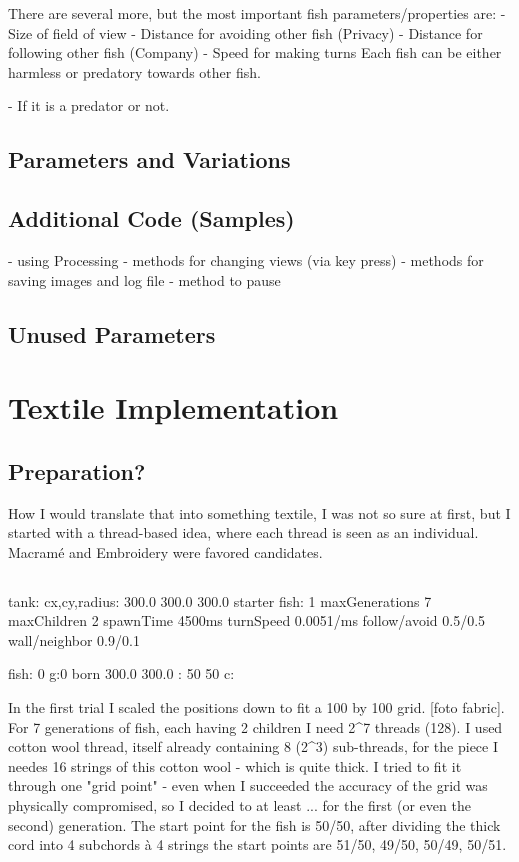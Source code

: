 \documentclass{scrartcl}
\begin{document}
There are several more, but the most important fish parameters/properties are:
-	Size of field of view
-	Distance for avoiding other fish (Privacy)
-	Distance for following other fish (Company)
-	Speed for making turns
Each fish can be either harmless or predatory towards other fish.

-	If it is a predator or not.

\subsection{Parameters and Variations} %

\subsection{Additional Code (Samples)}
- using Processing
- methods for changing views (via key press)
- methods for saving images and log file
- method to pause


\subsection{Unused Parameters}


\section{Textile Implementation}

\subsection{Preparation?}
How I would translate that into something textile, I was not so sure at first, but I started with a thread-based idea, where each thread is seen as an individual. Macramé and Embroidery were favored candidates.

\subsection{}
tank:
cx,cy,radius: 300.0 300.0 300.0
starter fish: 1
maxGenerations 7
maxChildren 2
spawnTime 4500ms
turnSpeed 0.0051/ms
follow/avoid 0.5/0.5
wall/neighbor 0.9/0.1

fish:
0 g:0 born 300.0 300.0 : 50 50 c:

In the first trial I scaled the positions down to fit a 100 by 100 grid. [foto fabric].
For 7 generations of fish, each having 2 children I need 2^7 threads (128). I used cotton wool thread, itself already containing 8 (2^3) sub-threads, for the piece I needes 16 strings of this cotton wool - which is quite thick. I tried to fit it through one "grid point" - even when I succeeded the accuracy of the grid was physically compromised, so I decided to at least ... for the first (or even the second) generation. The start point for the fish is 50/50, after dividing the thick cord into 4 subchords à 4 strings the start points are 51/50, 49/50, 50/49, 50/51.
\end{document}
